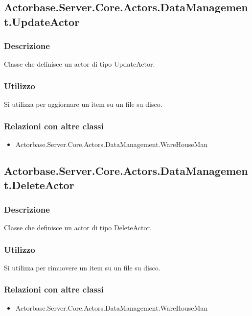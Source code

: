 \documentclass[a4paper]{article}
\begin{document}
		\subsection{Actorbase.Server.Core.Actors.DataManagement.UpdateActor}
			\subsubsection{Descrizione}
				Classe che definisce un actor di tipo UpdateActor.
			\subsubsection{Utilizzo}
				Si utilizza per aggiornare un item su un file su disco.
			\subsubsection{Relazioni con altre classi}
			\begin{itemize}
				\item Actorbase.Server.Core.Actors.DataManagement.WareHouseMan
			\end{itemize}
			
		\subsection{Actorbase.Server.Core.Actors.DataManagement.DeleteActor}
			\subsubsection{Descrizione}
				Classe che definisce un actor di tipo DeleteActor.
			\subsubsection{Utilizzo}
				Si utilizza per rimuovere un item su un file su disco. 
			\subsubsection{Relazioni con altre classi}
			\begin{itemize}
				\item Actorbase.Server.Core.Actors.DataManagement.WareHouseMan
			\end{itemize}
			
\end{document}
